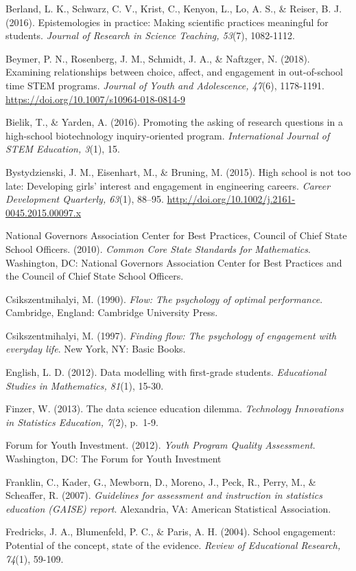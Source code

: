 \documentclass[]{msu-thesis}
\theoremstyle{definition}
\theoremstyle{definition}
\theoremstyle{definition}
\theoremstyle{remark}
\begin{document}
Berland, L. K., Schwarz, C. V., Krist, C., Kenyon, L., Lo, A. S., \&
Reiser, B. J. (2016). Epistemologies in practice: Making scientific
practices meaningful for students. \emph{Journal of Research in Science
Teaching, 53}(7), 1082-1112.

Beymer, P. N., Rosenberg, J. M., Schmidt, J. A., \& Naftzger, N. (2018).
Examining relationships between choice, affect, and engagement in
out-of-school time STEM programs. \emph{Journal of Youth and
Adolescence, 47}(6), 1178-1191.
\url{https://doi.org/10.1007/s10964-018-0814-9}

Bielik, T., \& Yarden, A. (2016). Promoting the asking of research
questions in a high-school biotechnology inquiry-oriented program.
\emph{International Journal of STEM Education, 3}(1), 15.

Bystydzienski, J. M., Eisenhart, M., \& Bruning, M. (2015). High school
is not too late: Developing girls' interest and engagement in
engineering careers. \emph{Career Development Quarterly, 63}(1), 88--95.
\url{http://doi.org/10.1002/j.2161-0045.2015.00097.x}

National Governors Association Center for Best Practices, Council of
Chief State School Officers. (2010). \emph{Common Core State Standards
for Mathematics}. Washington, DC: National Governors Association Center
for Best Practices and the Council of Chief State School Officers.

Csikszentmihalyi, M. (1990). \emph{Flow: The psychology of optimal
performance}. Cambridge, England: Cambridge University Press.

Csikszentmihalyi, M. (1997). \emph{Finding flow: The psychology of
engagement with everyday life}. New York, NY: Basic Books.

English, L. D. (2012). Data modelling with first-grade students.
\emph{Educational Studies in Mathematics, 81}(1), 15-30.

Finzer, W. (2013). The data science education dilemma. \emph{Technology
Innovations in Statistics Education, 7}(2), p.~1-9.

Forum for Youth Investment. (2012). \emph{Youth Program Quality
Assessment}. Washington, DC: The Forum for Youth Investment

Franklin, C., Kader, G., Mewborn, D., Moreno, J., Peck, R., Perry, M.,
\& Scheaffer, R. (2007). \emph{Guidelines for assessment and instruction
in statistics education (GAISE) report}. Alexandria, VA: American
Statistical Association.

Fredricks, J. A., Blumenfeld, P. C., \& Paris, A. H. (2004). School
engagement: Potential of the concept, state of the evidence.
\emph{Review of Educational Research, 74}(1), 59-109.
\end{document}
